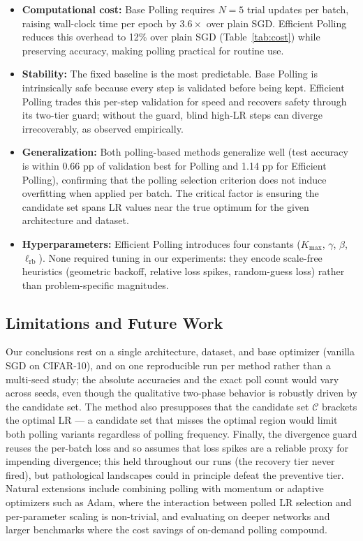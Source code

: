 \documentclass[conference]{IEEEtran}
\begin{document}
\begin{itemize}
\item \textbf{Computational cost:} Base Polling requires $N = 5$ trial updates per batch, raising wall-clock time per epoch by $3.6\times$ over plain SGD. Efficient Polling reduces this overhead to 12\% over plain SGD (Table~\ref{tab:cost}) while preserving accuracy, making polling practical for routine use.
\item \textbf{Stability:} The fixed baseline is the most predictable. Base Polling is intrinsically safe because every step is validated before being kept. Efficient Polling trades this per-step validation for speed and recovers safety through its two-tier guard; without the guard, blind high-LR steps can diverge irrecoverably, as observed empirically.
\item \textbf{Generalization:} Both polling-based methods generalize well (test accuracy is within 0.66 pp of validation best for Polling and 1.14 pp for Efficient Polling), confirming that the polling selection criterion does not induce overfitting when applied per batch. The critical factor is ensuring the candidate set spans LR values near the true optimum for the given architecture and dataset.
\item \textbf{Hyperparameters:} Efficient Polling introduces four constants ($K_{\max}$, $\gamma$, $\beta$, $\ell_{\mathrm{rb}}$). None required tuning in our experiments: they encode scale-free heuristics (geometric backoff, relative loss spikes, random-guess loss) rather than problem-specific magnitudes.
\end{itemize}

\subsection{Limitations and Future Work}

Our conclusions rest on a single architecture, dataset, and base optimizer (vanilla SGD on CIFAR-10), and on one reproducible run per method rather than a multi-seed study; the absolute accuracies and the exact poll count would vary across seeds, even though the qualitative two-phase behavior is robustly driven by the candidate set. The method also presupposes that the candidate set $\mathcal{C}$ brackets the optimal LR --- a candidate set that misses the optimal region would limit both polling variants regardless of polling frequency. Finally, the divergence guard reuses the per-batch loss and so assumes that loss spikes are a reliable proxy for impending divergence; this held throughout our runs (the recovery tier never fired), but pathological landscapes could in principle defeat the preventive tier. Natural extensions include combining polling with momentum or adaptive optimizers such as Adam, where the interaction between polled LR selection and per-parameter scaling is non-trivial, and evaluating on deeper networks and larger benchmarks where the cost savings of on-demand polling compound.
\end{document}
